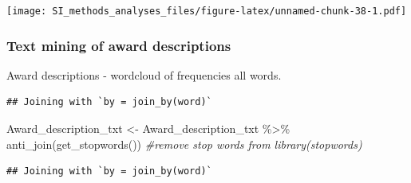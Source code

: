 \documentclass[
]{article}
\newenvironment{Shaded}{\begin{snugshade}}{\end{snugshade}}
\newcommand{\AttributeTok}[1]{\textcolor[rgb]{0.77,0.63,0.00}{#1}}
\newcommand{\CommentTok}[1]{\textcolor[rgb]{0.56,0.35,0.01}{\textit{#1}}}
\newcommand{\ConstantTok}[1]{\textcolor[rgb]{0.00,0.00,0.00}{#1}}
\newcommand{\FunctionTok}[1]{\textcolor[rgb]{0.00,0.00,0.00}{#1}}
\newcommand{\NormalTok}[1]{#1}
\newcommand{\OtherTok}[1]{\textcolor[rgb]{0.56,0.35,0.01}{#1}}
\newcommand{\SpecialCharTok}[1]{\textcolor[rgb]{0.00,0.00,0.00}{#1}}
\newcommand{\StringTok}[1]{\textcolor[rgb]{0.31,0.60,0.02}{#1}}
\begin{document}
\texttt{[image: SI\_methods\_analyses\_files/figure-latex/unnamed-chunk-38-1.pdf]}

\hypertarget{text-mining-of-award-descriptions}{%
\subsubsection{Text mining of award
descriptions}\label{text-mining-of-award-descriptions}}

Award descriptions - wordcloud of frequencies all words.

\begin{Shaded}
\end{Shaded}

\begin{verbatim}
## Joining with `by = join_by(word)`
\end{verbatim}

\begin{Shaded}
\begin{Highlighting}[]
\NormalTok{Award\_description\_txt }\OtherTok{\textless{}{-}}\NormalTok{ Award\_description\_txt }\SpecialCharTok{\%\textgreater{}\%} \FunctionTok{anti\_join}\NormalTok{(}\FunctionTok{get\_stopwords}\NormalTok{()) }\CommentTok{\#remove stop words from library(stopwords) }
\end{Highlighting}
\end{Shaded}

\begin{verbatim}
## Joining with `by = join_by(word)`
\end{verbatim}
\end{document}
